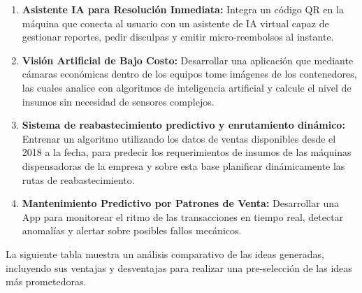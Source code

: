 \begin{enumerate}
\def\labelenumi{\arabic{enumi})}
\item
  \textbf{Asistente IA para Resolución Inmediata:} Integra un código QR en la máquina que conecta al usuario con un asistente de IA virtual capaz de gestionar reportes, pedir disculpas y emitir micro-reembolsos al instante.
\item
  \textbf{Visión Artificial de Bajo Costo:} Desarrollar una aplicación que mediante cámaras económicas dentro de los equipos tome imágenes de los contenedores, las cuales analice con algoritmos de inteligencia artificial y calcule el nivel de insumos sin necesidad de sensores complejos.
\item
  \textbf{Sistema de reabastecimiento predictivo y enrutamiento dinámico:} Entrenar un algoritmo utilizando los datos de ventas disponibles desde el 2018 a la fecha, para predecir los requerimientos de insumos de las máquinas dispensadoras de la empresa y sobre esta base planificar dinámicamente las rutas de reabastecimiento.
\item
  \textbf{Mantenimiento Predictivo por Patrones de Venta:} Desarrollar una App para monitorear el ritmo de las transacciones en tiempo real, detectar anomalías y alertar sobre posibles fallos mecánicos.
\end{enumerate}

La siguiente tabla muestra un análisis comparativo de las ideas generadas, incluyendo sus ventajas y desventajas para realizar una pre-selección de las ideas más prometedoras.

\label{tab:analisis-comparativo-de-las-ideas}

